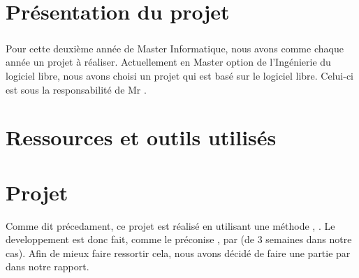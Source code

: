 \documentclass[french]{report}
\begin{document}
\tableofcontents




\chapter{Présentation du projet}
\paragraph{}Pour cette deuxième année de Master Informatique, nous avons comme chaque année un projet à réaliser. Actuellement en Master option de l'Ingénierie du logiciel libre, nous avons choisi un projet qui est basé sur le logiciel libre. Celui-ci est sous la responsabilité de Mr \responsableProjet.



\chapter{Ressources et outils utilisés}



\chapter{Projet}
Comme dit précedament, ce projet est réalisé en utilisant une méthode \agile{}, \scrum{}. Le developpement est donc fait, comme le préconise \scrum{}, par \sprint{} (de 3 semaines dans notre cas). Afin de mieux faire ressortir cela, nous avons décidé de faire une partie par \sprint{} dans notre rapport.
\end{document}
